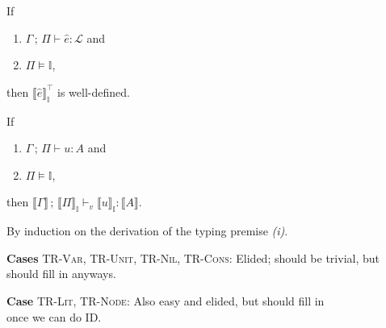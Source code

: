 \documentclass{article}
\newcommand{\mc}[1]{\mathcal{#1}}
\newcommand{\tb}[1]{\textbf{#1}}
\newcommand{\ts}[1]{\textsc{#1}}
\newcommand{\semi}{\,;\,}
\newcommand{\hl}[1]{\colorbox{LightGoldenrod1}{#1}}
\newcommand{\llrr}[1]{\llbracket #1 \rrbracket}
\newcommand{\Ell}{\mc{L}}
\newcommand{\I}{\mathbb{I}}
\begin{document}
\begin{corollary}
If \begin{enumerate}[label=(\roman*)]
\item $\Gamma \semi \Pi \vdash \hat{e}: \Ell$ and
\item $\Pi \vDash \I$,
\end{enumerate}
then $\llrr{\hat{e}}^\top_\I$ is well-defined.
\end{corollary}

\begin{lemma}
If \begin{enumerate}[label=(\roman*)]
\item $\Gamma \semi \Pi \vdash u: A$ and
\item $\Pi \vDash \I$,
\end{enumerate}
then $\llrr{\Gamma} \semi \llrr{\Pi}_\I
\vdash_v \llrr{u}_\I: \llrr{A}$.

\begin{Proof}
By induction on the derivation of the typing premise \emph{(i)}.

\tb{Cases} \ts{TR-Var}, \ts{TR-Unit}, \ts{TR-Nil}, \ts{TR-Cons}:
Elided; should be trivial, but should fill in anyways.

\tb{Case} \ts{TR-Lit}, \ts{TR-Node}:
Also easy and elided, but should fill in\\
\hl{once we can do ID}.


\end{Proof}
\end{lemma}
\end{document}
